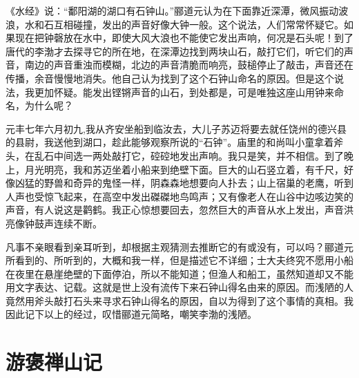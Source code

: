 \documentclass[12pt,UTF-8,openany]{ctexbook}
\begin{document}
\vspace{1em}

\begin{normalsize}
    
    《水经》说：“鄱阳湖的湖口有石钟山。”郦道元认为在下面靠近深潭，微风振动波浪，水和石互相碰撞，发出的声音好像大钟一般。这个说法，人们常常怀疑它。如果现在把钟磬放在水中，即使大风大浪也不能使它发出声响，何况是石头呢！到了唐代的李渤才去探寻它的所在地，在深潭边找到两块山石，敲打它们，听它们的声音，南边的声音重浊而模糊，北边的声音清脆而响亮，鼓槌停止了敲击，声音还在传播，余音慢慢地消失。他自己认为找到了这个石钟山命名的原因。但是这个说法，我更加怀疑。能发出铿锵声音的山石，到处都是，可是唯独这座山用钟来命名，为什么呢？
    
    元丰七年六月初九,我从齐安坐船到临汝去，大儿子苏迈将要去就任饶州的德兴县的县尉，我送他到湖口，趁此能够观察所说的“石钟”。庙里的和尚叫小童拿着斧头，在乱石中间选一两处敲打它，硿硿地发出声响。我只是笑，并不相信。到了晚上，月光明亮，我和苏迈坐着小船来到绝壁下面。巨大的山石竖立着，有千尺，好像凶猛的野兽和奇异的鬼怪一样，阴森森地想要向人扑去；山上宿巢的老鹰，听到人声也受惊飞起来，在高空中发出磔磔地鸟鸣声；又有像老人在山谷中边咳边笑的声音，有人说这是鹳鹤。我正心惊想要回去，忽然巨大的声音从水上发出，声音洪亮像钟鼓声连续不断。
    
    凡事不亲眼看到亲耳听到，却根据主观猜测去推断它的有或没有，可以吗？郦道元所看到的、所听到的，大概和我一样，但是描述它不详细；士大夫终究不愿用小船在夜里在悬崖绝壁的下面停泊，所以不能知道；但渔人和船工，虽然知道却又不能用文字表达、记载。这就是世上没有流传下来石钟山得名由来的原因。而浅陋的人竟然用斧头敲打石头来寻求石钟山得名的原因，自以为得到了这个事情的真相。我因此记下以上的经过，叹惜郦道元简略，嘲笑李渤的浅陋。
    
    
    
\end{normalsize}



\chapter{游褒禅山记}
\end{document}
